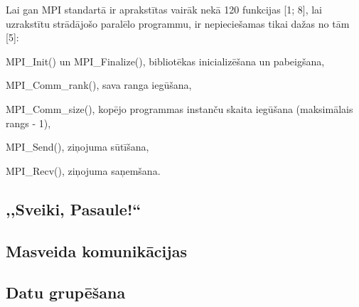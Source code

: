 Lai gan MPI standartā ir aprakstītas vairāk nekā 120 funkcijas [1; 8], lai uzrakstītu
strādājošo paralēlo programmu, ir nepieciešamas tikai dažas no tām [5]:
\begin{dotlist}
	\item MPI\_Init() un MPI\_Finalize(), bibliotēkas inicializēšana un pabeigšana,
	\item MPI\_Comm\_rank(), sava ranga iegūšana,
	\item MPI\_Comm\_size(), kopējo programmas instanču skaita iegūšana (maksimālais rangs - 1),
	\item MPI\_Send(), ziņojuma sūtīšana,
	\item MPI\_Recv(), ziņojuma saņemšana.
\end{dotlist}

\subsection{,,Sveiki, Pasaule!{}``}
\subsection{Masveida komunikācijas}
\subsection{Datu grupēšana}

